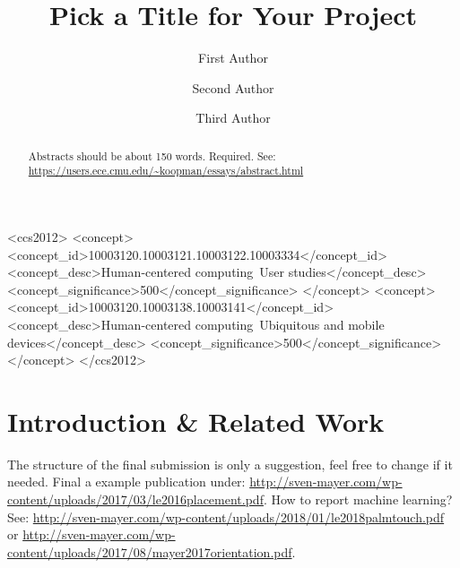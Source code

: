 \documentclass[sigchi-a, authorversion]{acmart}
\begin{document}
\title{Pick a Title for Your Project}

\author{First Author}

\author{Second Author}

\author{Third Author}


\renewcommand{\shortauthors}{F. Author et al.}


%
%


\begin{CCSXML}
<ccs2012>
 <concept>
<concept_id>10003120.10003121.10003122.10003334</concept_id>
<concept_desc>Human-centered computing~User studies</concept_desc>
<concept_significance>500</concept_significance>
</concept>
<concept>
<concept_id>10003120.10003138.10003141</concept_id>
<concept_desc>Human-centered computing~Ubiquitous and mobile devices</concept_desc>
<concept_significance>500</concept_significance>
</concept>
</ccs2012>
\end{CCSXML}



\begin{abstract}
Abstracts should be about 150 words. Required. See: \url{https://users.ece.cmu.edu/~koopman/essays/abstract.html}
\end{abstract}



\maketitle

\section{Introduction \& Related Work}
The structure of the final submission is only a suggestion, feel free to change if it needed. Final a example publication under: \url{http://sven-mayer.com/wp-content/uploads/2017/03/le2016placement.pdf}. How to report machine learning? See: \url{http://sven-mayer.com/wp-content/uploads/2018/01/le2018palmtouch.pdf} or \url{http://sven-mayer.com/wp-content/uploads/2017/08/mayer2017orientation.pdf}.
\end{document}
